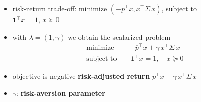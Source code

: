 \documentclass[11pt]{extarticle}
\newcommand{\ds}{\displaystyle}
\theoremstyle{definition}
\begin{document}
\begin{itemize}
  \item risk-return trade-off: minimize $\ds(-\overline{p}^\top x, x^\top\Sigma\,x)$, subject to \\$\mathbf{1}^\top x = 1$, $x\succcurlyeq 0$
  \item with $\lambda = (1, \gamma)$ we obtain the scalarized problem
    \begin{align*}
      \text{minimize}\quad &-\overline{p}^\top x + \gamma\,x^\top\Sigma\,x \\
      \text{subject to}\quad &\,\mathbf{1}^\top x = 1,\quad x\succcurlyeq 0
    \end{align*}
  \item objective is negative {\bf risk-adjusted return} $\overline{p}^\top x - \gamma\,x^\top\Sigma\,x$ 
  \item $\gamma$: {\bf risk-aversion parameter}
\end{itemize}

\newpage



\end{document}
